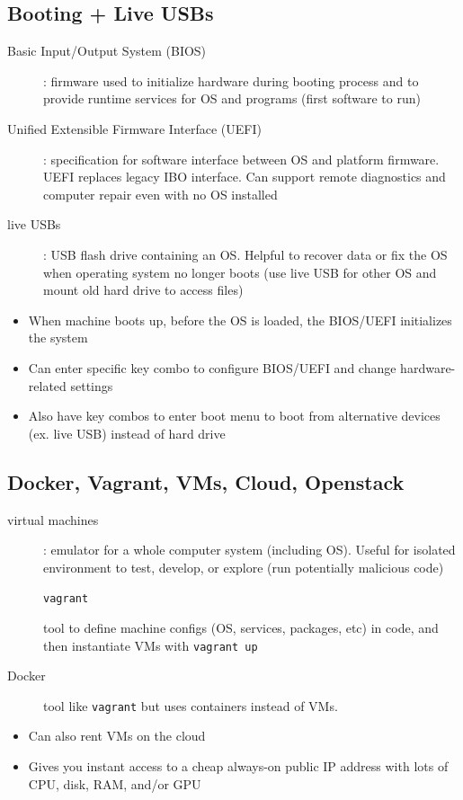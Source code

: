 \documentclass[letterpaper,12pt]{article}
\newcommand*{\lstitem}[1]{
  \setbox0\hbox{\lstinline{#1}}
  \item[\usebox0]
}
\begin{document}
\subsection{Booting + Live USBs}
\begin{description}
 \item[Basic Input/Output System (BIOS)]: firmware used to initialize hardware during booting process and to provide runtime services for OS and programs (first software to run)
 \item[Unified Extensible Firmware Interface (UEFI)]: specification for software interface between OS and platform firmware. UEFI replaces legacy IBO interface. Can support remote diagnostics and computer repair even with no OS installed
 \item[live USBs]: USB flash drive containing an OS. Helpful to recover data or fix the OS when operating system no longer boots (use live USB for other OS and mount old hard drive to access files)
\end{description}

\begin{itemize}
 \item When machine boots up, before the OS is loaded, the BIOS/UEFI initializes the system
 \item Can enter specific key combo to configure BIOS/UEFI and change hardware-related settings
 \item Also have key combos to enter boot menu to boot from alternative devices (ex. live USB) instead of hard drive
\end{itemize}

\subsection{Docker, Vagrant, VMs, Cloud, Openstack}
\begin{description}
 \item[virtual machines]: emulator for a whole computer system (including OS). Useful for isolated environment to test, develop, or explore (run potentially malicious code)
       \lstitem{vagrant} tool to define machine configs (OS, services, packages, etc) in code, and then instantiate VMs with \lstinline{vagrant up}
 \item[Docker] tool like \lstinline{vagrant} but uses containers instead of VMs.
\end{description}

\begin{itemize}
 \item Can also rent VMs on the cloud
 \item Gives you instant access to a cheap always-on public IP address with lots of CPU, disk, RAM, and/or GPU
\end{itemize}
\end{document}
